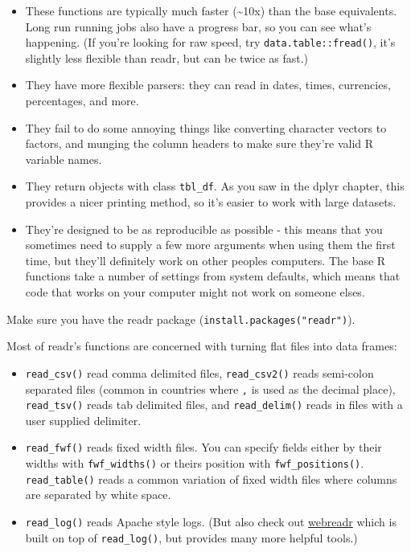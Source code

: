 \begin{itemize}
\item
  These functions are typically much faster (\textasciitilde{}10x) than
  the base equivalents. Long run running jobs also have a progress bar,
  so you can see what's happening. (If you're looking for raw speed, try
  \texttt{data.table::fread()}, it's slightly less flexible than readr,
  but can be twice as fast.)
\item
  They have more flexible parsers: they can read in dates, times,
  currencies, percentages, and more.
\item
  They fail to do some annoying things like converting character vectors
  to factors, and munging the column headers to make sure they're valid
  R variable names.
\item
  They return objects with class \texttt{tbl\_df}. As you saw in the
  dplyr chapter, this provides a nicer printing method, so it's easier
  to work with large datasets.
\item
  They're designed to be as reproducible as possible - this means that
  you sometimes need to supply a few more arguments when using them the
  first time, but they'll definitely work on other peoples computers.
  The base R functions take a number of settings from system defaults,
  which means that code that works on your computer might not work on
  someone elses.
\end{itemize}

Make sure you have the readr package
(\texttt{install.packages("readr")}).

Most of readr's functions are concerned with turning flat files into
data frames:

\begin{itemize}
\item
  \texttt{read\_csv()} read comma delimited files, \texttt{read\_csv2()}
  reads semi-colon separated files (common in countries where \texttt{,}
  is used as the decimal place), \texttt{read\_tsv()} reads tab
  delimited files, and \texttt{read\_delim()} reads in files with a user
  supplied delimiter.
\item
  \texttt{read\_fwf()} reads fixed width files. You can specify fields
  either by their widths with \texttt{fwf\_widths()} or theirs position
  with \texttt{fwf\_positions()}. \texttt{read\_table()} reads a common
  variation of fixed width files where columns are separated by white
  space.
\item
  \texttt{read\_log()} reads Apache style logs. (But also check out
  \href{https://github.com/Ironholds/webreadr}{webreadr} which is built
  on top of \texttt{read\_log()}, but provides many more helpful tools.)
\end{itemize}

